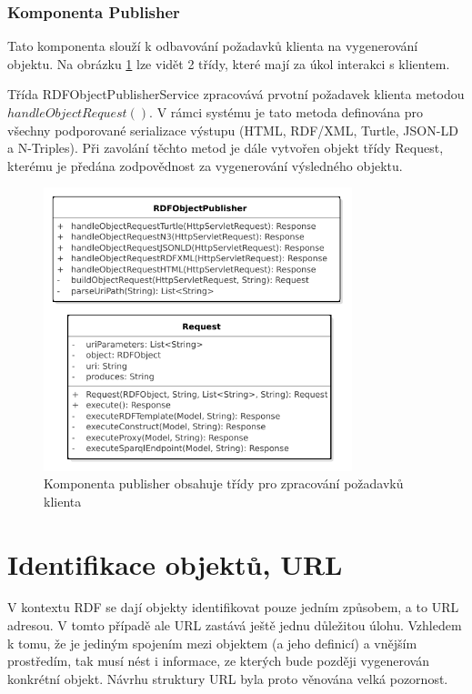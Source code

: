 \documentclass[thesis=B,czech]{FITthesis}[2012/06/26]
\begin{document}
    \subsubsection{Komponenta Publisher}
    Tato komponenta slouží k odbavování požadavků klienta na vygenerování objektu. Na obrázku \ref{publisher_class} lze vidět 2 třídy,
    které mají za úkol interakci s klientem.
    
    Třída RDFObjectPublisherService zpracovává prvotní požadavek klienta metodou $handleObjectRequest()$. V rámci systému je tato metoda definována
    pro všechny podporované serializace výstupu (HTML, RDF/XML, Turtle, JSON-LD a N-Triples). Při zavolání těchto metod je dále vytvořen 
    objekt třídy Request, kterému je předána zodpovědnost za vygenerování výsledného objektu. 
    
    \begin{figure}\centering
 	\includegraphics[width=0.8\textwidth]{Publisher.pdf}
 	\caption[Model tříd komponenty publisher]{Komponenta publisher obsahuje třídy pro zpracování požadavků klienta}\label{publisher_class}
    \end{figure}
    
    
   \newpage
   
   
 
 \section{Identifikace objektů, URL}
 \label{sec:identifikace}
 V kontextu RDF se dají objekty identifikovat pouze jedním způsobem, a to URL adresou. V tomto případě ale URL zastává ještě jednu důležitou úlohu.
 Vzhledem k tomu, že je jediným spojením mezi objektem (a jeho definicí) a vnějším prostředím, tak musí nést i informace, ze kterých bude později vygenerován
 konkrétní objekt. Návrhu struktury URL byla proto věnována velká pozornost.
 
\end{document}
